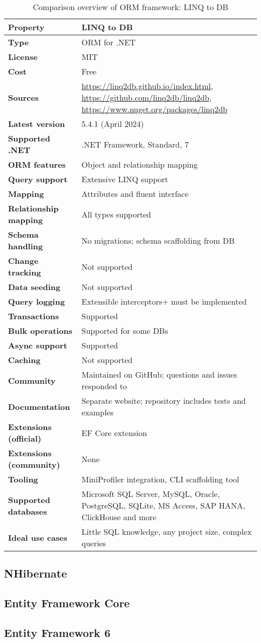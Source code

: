 \begin{table}[H]
\centering
\caption{Comparison overview of ORM framework: LINQ to DB}
\begin{tabular}{|l|l|}
\toprule
\textbf{Property} & \textbf{LINQ to DB} \\
\midrule
\textbf{Type} & ORM for .NET \\
\textbf{License} & MIT \\
\textbf{Cost} & Free \\
\textbf{Sources} & \url{https://linq2db.github.io/index.html}, \url{https://github.com/linq2db/linq2db}, \url{https://www.nuget.org/packages/linq2db}  \\
\textbf{Latest version} & 5.4.1 (April 2024) \\
\textbf{Supported .NET} & .NET Framework, Standard, 7 \\
\textbf{ORM features} & Object and relationship mapping \\
\textbf{Query support} & Extensive LINQ support \\
\textbf{Mapping} & Attributes and fluent interface \\
\textbf{Relationship mapping} & All types supported \\
\textbf{Schema handling} & No migrations; schema scaffolding from DB \\
\textbf{Change tracking} & Not supported \\
\textbf{Data seeding} & Not supported \\
\textbf{Query logging} & Extensible interceptors+ must be implemented \\
\textbf{Transactions} & Supported \\
\textbf{Bulk operations} & Supported for some DBs\\
\textbf{Async support} & Supported \\
\textbf{Caching} & Not supported \\
\textbf{Community} & Maintained on GitHub; questions and issues responded to \\
\textbf{Documentation} & Separate website; repository includes tests and examples\\
\textbf{Extensions (official)} & EF Core extension \\
\textbf{Extensions (community)} & None \\
\textbf{Tooling} & MiniProfiler integration, CLI scaffolding tool \\
\textbf{Supported databases} & Microsoft SQL Server, MySQL, Oracle, PostgreSQL, SQLite, MS Access, SAP HANA, ClickHouse and more  \\
\textbf{Ideal use cases} & Little SQL knowledge, any project size, complex queries \\
\bottomrule
\end{tabular}
\end{table}


\subsection{NHibernate}

\subsection{Entity Framework Core}

\subsection{Entity Framework 6}